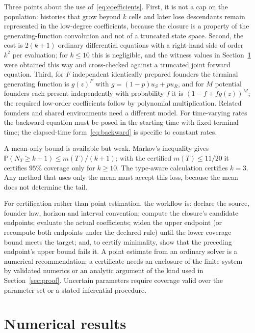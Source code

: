 \documentclass[11pt,a4paper]{article}
\theoremstyle{plain}
\theoremstyle{definition}
\theoremstyle{remark}
\newcommand{\PP}{\mathbb P}
\begin{document}
Three points about the use of~\eqref{eq:coefficients}. First, it is not a cap on the population: histories that grow beyond $k$ cells and later lose descendants remain represented in the low-degree coefficients, because the closure is a property of the generating-function convolution and not of a truncated state space. Second, the cost is $2(k+1)$ ordinary differential equations with a right-hand side of order $k^2$ per evaluation; for $k\le10$ this is negligible, and the witness values in Section~\ref{sec:numerics} were obtained this way and cross-checked against a truncated joint forward equation. Third, for $F$ independent identically prepared founders the terminal generating function is $g(z)^F$ with $g=(1-p)u_S+pu_R$, and for $M$ potential founders each present independently with probability $f$ it is $(1-f+fg(z))^M$; the required low-order coefficients follow by polynomial multiplication. Related founders and shared environments need a different model. For time-varying rates the backward equation must be posed in the starting time with fixed terminal time; the elapsed-time form~\eqref{eq:backward} is specific to constant rates.

A mean-only bound is available but weak. Markov's inequality gives $\PP(N_T\ge k+1)\le m(T)/(k+1)$; with the certified $m(T)\le11/20$ it certifies $95\%$ coverage only for $k\ge10$. The type-aware calculation certifies $k=3$. Any method that uses only the mean must accept this loss, because the mean does not determine the tail.

For certification rather than point estimation, the workflow is: declare the source, founder law, horizon and interval convention; compute the closure's candidate endpoints; evaluate the actual coefficients; widen the upper endpoint (or recompute both endpoints under the declared rule) until the lower coverage bound meets the target; and, to certify minimality, show that the preceding endpoint's upper bound fails it. A point estimate from an ordinary solver is a numerical recommendation; a certificate needs an enclosure of the finite system by validated numerics or an analytic argument of the kind used in Section~\ref{sec:proof}. Uncertain parameters require coverage valid over the parameter set or a stated inferential procedure.

\section{Numerical results}\label{sec:numerics}
\end{document}
